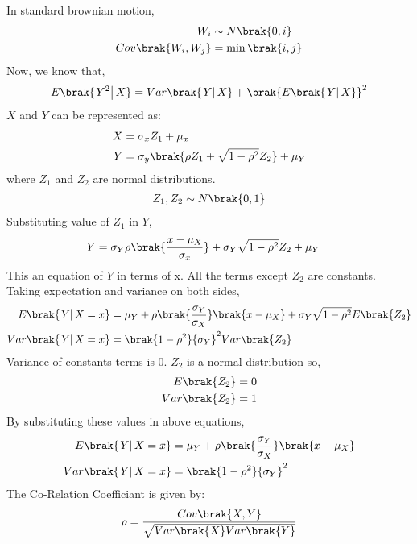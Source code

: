 \documentclass[journal,12pt,twocolumn]{IEEEtran}
\theoremstyle{remark}
\begin{document}
\solution
\begin{table}[H]

\end{table}
In standard brownian motion, 
\begin{align}
W_i &\sim N\brak{0,i}\\
Cov\brak{W_i,W_j} &= \min\brak{i,j} 
\end{align}
Now, we know that,
\begin{align}
E\brak{\left.Y^2\right | X} = Var\brak{\left.Y\right | X} + \brak{E\brak{\left.Y\right | X}}^2 \label{33.2023}
\end{align}
$X$ and $Y$ can be represented as:
\begin{align}
X &= \sigma_xZ_1 + \mu_x\\
Y &= \sigma_y\brak{{\rho}Z_1 + \sqrt{1-{\rho}^2}Z_2} + \mu_Y
\end{align}
where $Z_1$ and $Z_2$ are normal distributions.
\begin{align}
Z_1, Z_2 \sim N\brak{0,1}
\end{align}
Substituting value of $Z_1$ in $Y$,
\begin{align}
Y &= \sigma_Y\rho\brak{\frac{x - \mu_X}{\sigma_x}} + \sigma_Y\sqrt{1 - {\rho}^2}Z_2 + \mu_Y
\end{align}
This an equation of $Y$ in terms of x. All the terms except $Z_2$ are constants. Taking expectation and variance on both sides, 
\begin{align}
E\brak{\left.Y\right | X=x} &= \mu_Y +\rho\brak{\frac{\sigma_Y}{\sigma_X}}\brak{x - \mu_X} + \sigma_Y\sqrt{1 - {\rho}^2}E\brak{Z_2}\\
Var\brak{\left.Y\right | X=x} &= {\brak{1 - {\rho}^2}{\sigma_Y}^2}Var\brak{Z_2}
\end{align}
Variance of constants terms is 0. $Z_2$ is a normal distribution so,
\begin{align}
E\brak{Z_2} &= 0\\
Var\brak{Z_2} &= 1
\end{align}
By substituting these values in above equations,
\begin{align}
E\brak{\left.Y\right | X=x} &= \mu_Y +\rho\brak{\frac{\sigma_Y}{\sigma_X}}\brak{x - \mu_X}\\
Var\brak{\left.Y\right | X=x} &= \brak{1 - {\rho}^2}{\sigma_Y}^2
\end{align}
The Co-Relation Coefficiant is given by:
\begin{align}
\rho = \frac{Cov\brak{X,Y}}{\sqrt{Var\brak{X}Var\brak{Y}}}  
\end{align}
\end{document}
